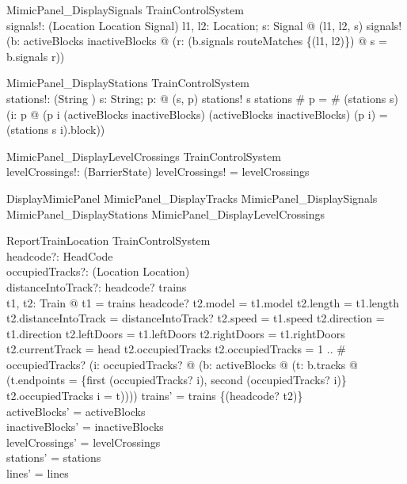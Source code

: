 \begin{schema}{MimicPanel\_DisplaySignals}
  \Xi TrainControlSystem\\
  signals!: \finset  (Location \cross  Location \cross  Signal)
\where
  \forall  l1, l2: Location; s: Signal @ (l1, l2, s) \in  signals! \iff  (\exists  b: \ran  activeBlocks \cup  \ran  inactiveBlocks @ (\exists  r: \dom  (\dom  b.signals \dres  routeMatches \rres  \{(l1, l2)\}) @ s = b.signals r))
\end{schema}

\begin{schema}{MimicPanel\_DisplayStations}
  \Xi TrainControlSystem\\
  stations!: \finset  (String \cross  \iseq  \nat )
\where
  \forall  s: String; p: \iseq  \nat  @ (s, p) \in  stations! \iff  s \in  \dom  stations \land  \# p = \# (stations s) \land  (\forall  i: \dom  p @ (p i \in  \dom  (activeBlocks \cup  inactiveBlocks) \land  (activeBlocks \cup  inactiveBlocks) (p i) = (stations s i).block))
\end{schema}

\begin{schema}{MimicPanel\_DisplayLevelCrossings}
  \Xi TrainControlSystem\\
  levelCrossings!: \finset  (\finset  \nat  \cross  BarrierState)
\where
  levelCrossings! = levelCrossings
\end{schema}

\begin{zed}
DisplayMimicPanel  MimicPanel\_DisplayTracks \land  MimicPanel\_DisplaySignals \land  MimicPanel\_DisplayStations \land  MimicPanel\_DisplayLevelCrossings
\end{zed}

\begin{schema}{ReportTrainLocation}
  \Delta TrainControlSystem\\
  headcode?: HeadCode\\
  occupiedTracks?: \iseq  (Location \cross  Location)\\
  distanceIntoTrack?: \nat 
\where
  headcode? \in  \dom  trains\\
  \exists  t1, t2: Train @ t1 = trains headcode? \land  t2.model = t1.model \land  t2.length = t1.length \land  t2.distanceIntoTrack = distanceIntoTrack? \land  t2.speed = t1.speed \land  t2.direction = t1.direction \land  t2.leftDoors = t1.leftDoors \land  t2.rightDoors = t1.rightDoors \land  t2.currentTrack = head t2.occupiedTracks \land  \dom  t2.occupiedTracks = 1 .. \# occupiedTracks? \land  (\forall  i: \dom  occupiedTracks? @ (\exists  b: \ran  activeBlocks @ (\exists  t: b.tracks @ (t.endpoints = \{first (occupiedTracks? i), second (occupiedTracks? i)\} \land  t2.occupiedTracks i = t)))) \land  trains' = trains \oplus  \{(headcode? \mapsto  t2)\}\\
  activeBlocks' = activeBlocks\\
  inactiveBlocks' = inactiveBlocks\\
  levelCrossings' = levelCrossings\\
  stations' = stations\\
  lines' = lines
\end{schema}

